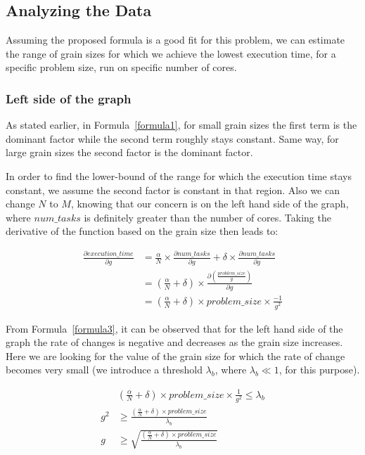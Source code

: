 \subsection{Analyzing the Data}
Assuming the proposed formula is a good fit for this problem, we can estimate the range of grain sizes for which we achieve the lowest execution time, for a specific problem size, run on specific number of cores.

\vspace{\baselineskip}
\subsubsection{Left side of the graph}
As stated earlier, in Formula~\ref{formula1}, for small grain sizes the first term is the dominant factor while the second term roughly stays constant. Same way, for large grain sizes the second factor is the dominant factor. 

In order to find the lower-bound of the range for which the execution time stays constant, we assume the second factor is constant in that region. Also we can change $N$ to $M$, knowing that our concern is on the left hand side of the graph, where $num\_{tasks}$ is definitely greater than the number of cores. 
Taking the derivative of the function based on the grain size then leads to:

 
\begin{equation}\label{formula3}
\begin{aligned}
\frac{\partial execution\_{time}}{\partial g} &= \frac{\alpha}{N}\times{\frac{\partial num\_{tasks}}{\partial g}}+\delta\times{\frac{\partial num\_{tasks}}{\partial g}} \\
&=(\frac{\alpha}{N}+\delta)\times\frac{\partial(\frac{problem\_{size}}{g})}{\partial g} \\
&=(\frac{\alpha}{N}+\delta)\times{problem\_{size}}\times{\frac{-1}{g^2}}
\end{aligned}
\end{equation}

From Formula~\ref{formula3}, it can be observed that for the left hand side of the graph the rate of changes is negative and decreases as the grain size increases. Here we are looking for the value of the grain size for which the rate of change becomes very small (we introduce a threshold $\lambda_b$, where $\lambda_b\ll1$, for this purpose). 


\begin{equation}\label{formula4}
\begin{aligned}
&(\frac{\alpha}{N}+\delta)\times{problem\_{size}}\times{\frac{1}{g^2}}\leq{\lambda_b} \\
{g^2}&\geq{\frac{(\frac{\alpha}{N}+\delta)\times{problem\_{size}}}{\lambda_b}}\\
{g}&\geq{\sqrt{\frac{(\frac{\alpha}{N}+\delta)\times{problem\_{size}}}{\lambda_b}}}
\end{aligned}
\end{equation}

